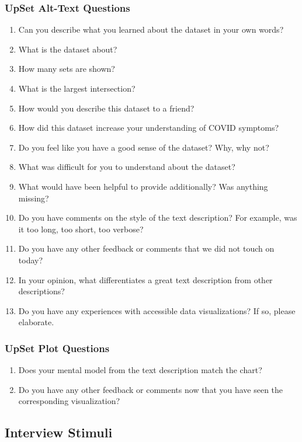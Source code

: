 \documentclass{egpubl}
\begin{document}
\subsubsection{UpSet Alt-Text Questions}
\begin{enumerate}
    \item Can you describe what you learned about the dataset in your own words?
    \item What is the dataset about?
    \item How many sets are shown?
    \item What is the largest intersection?
    \item How would you describe this dataset to a friend?
    \item How did this dataset increase your understanding of COVID symptoms?
    \item Do you feel like you have a good sense of the dataset? Why, why not?
    \item What was difficult for you to understand about the dataset?
    \item What would have been helpful to provide additionally? Was anything missing?
    \item Do you have comments on the style of the text description? For example, was it too long, too short, too verbose?
    \item Do you have any other feedback or comments that we did not touch on today?
    \item In your opinion, what differentiates a great text description from other descriptions?
    \item Do you have any experiences with accessible data visualizations? If so, please elaborate.
\end{enumerate}

\subsubsection{UpSet Plot Questions}
\begin{enumerate}
    \item Does your mental model from the text description match the chart?
    \item Do you have any other feedback or comments now that you have seen the corresponding visualization?
\end{enumerate}


\subsection{Interview Stimuli}
\end{document}
